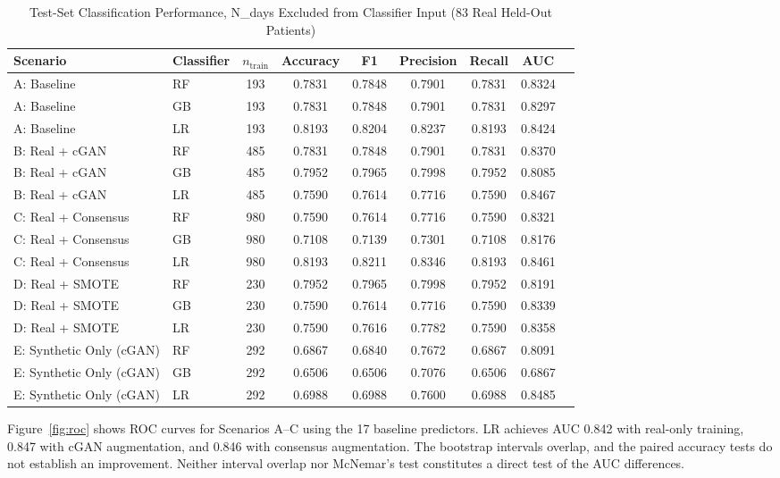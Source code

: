 \documentclass[journal]{IEEEtran}
\begin{document}
\begin{table}[t]
  \centering
  \caption{Test-Set Classification Performance, N\_days Excluded from Classifier Input (83 Real Held-Out Patients)}
  \label{tab:performance}
  \begin{tabular}{llccccccc}
    \toprule
    Scenario & Classifier & $n_{\text{train}}$ & Accuracy & F1 & Precision & Recall & AUC \\
    \midrule
    A: Baseline       & RF      & 193 & 0.7831 & 0.7848 & 0.7901 & 0.7831 & 0.8324 \\
    A: Baseline       & GB  & 193 & 0.7831 & 0.7848 & 0.7901 & 0.7831 & 0.8297 \\
    A: Baseline       & LR & 193 & 0.8193 & 0.8204 & 0.8237 & 0.8193 & 0.8424 \\
    \midrule
    B: Real + cGAN   & RF      & 485 & 0.7831 & 0.7848 & 0.7901 & 0.7831 & 0.8370 \\
    B: Real + cGAN   & GB  & 485 & 0.7952 & 0.7965 & 0.7998 & 0.7952 & 0.8085 \\
    B: Real + cGAN   & LR & 485 & 0.7590 & 0.7614 & 0.7716 & 0.7590 & 0.8467 \\
    \midrule
    C: Real + Consensus & RF    & 980 & 0.7590 & 0.7614 & 0.7716 & 0.7590 & 0.8321 \\
    C: Real + Consensus & GB& 980 & 0.7108 & 0.7139 & 0.7301 & 0.7108 & 0.8176 \\
    C: Real + Consensus & LR & 980 & 0.8193 & 0.8211 & 0.8346 & 0.8193 & 0.8461 \\
    \midrule
    D: Real + SMOTE   & RF      & 230 & 0.7952 & 0.7965 & 0.7998 & 0.7952 & 0.8191 \\
    D: Real + SMOTE   & GB  & 230 & 0.7590 & 0.7614 & 0.7716 & 0.7590 & 0.8339 \\
    D: Real + SMOTE   & LR & 230 & 0.7590 & 0.7616 & 0.7782 & 0.7590 & 0.8358 \\
    \midrule
    E: Synthetic Only (cGAN) & RF      & 292 & 0.6867 & 0.6840 & 0.7672 & 0.6867 & 0.8091 \\
    E: Synthetic Only (cGAN) & GB  & 292 & 0.6506 & 0.6506 & 0.7076 & 0.6506 & 0.6867 \\
    E: Synthetic Only (cGAN) & LR & 292 & 0.6988 & 0.6988 & 0.7600 & 0.6988 & 0.8485 \\
    \bottomrule
  \end{tabular}
\end{table}

Figure~\ref{fig:roc} shows ROC curves for Scenarios A--C using the 17 baseline predictors. LR achieves AUC 0.842 with real-only training, 0.847 with cGAN augmentation, and 0.846 with consensus augmentation. The bootstrap intervals overlap, and the paired accuracy tests do not establish an improvement. Neither interval overlap nor McNemar's test constitutes a direct test of the AUC differences.
\end{document}
